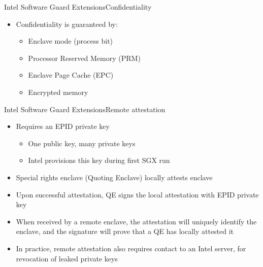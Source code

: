 \documentclass{beamer}
\begin{document}
\begin{frame}{Intel Software Guard Extensions}{Confidentiality}
    \begin{itemize}
    	\item Confidentiality is guaranteed by:

			\vfill

    	\begin{itemize}
    		\item Enclave mode (process bit)

  			\vfill

    		\item Processor Reserved Memory (PRM)

  			\vfill

    		\item Enclave Page Cache (EPC)

  			\vfill

    		\item Encrypted memory
    	\end{itemize}
    \end{itemize}
\end{frame}



\begin{frame}{Intel Software Guard Extensions}{Remote attestation}
	\begin{itemize}

		\vfill

		\item Requires an EPID private key
		\begin{itemize}
			\item One public key, many private keys
			\item Intel provisions this key during first SGX run
		\end{itemize}

		\vfill

		\item Special rights enclave (Quoting Enclave) locally attests enclave

		\vfill

		\item Upon successful attestation, QE signs the local attestation with EPID private key

		\vfill

		\item When received by a remote enclave, the attestation will uniquely identify the enclave, and the signature will prove that a QE has locally attested it

		\vfill

		\item In practice, remote attestation also requires contact to an Intel server, for revocation of leaked private keys
	\end{itemize}
\end{frame}
\end{document}
